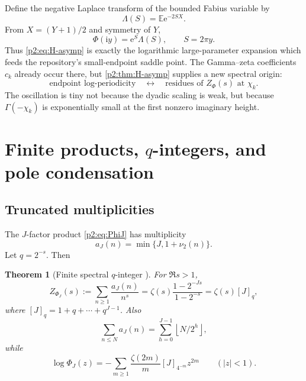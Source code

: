 \documentclass[11pt]{article}
\numberwithin{equation}{section}
\newtheorem{theorem}{Theorem}[section]
\theoremstyle{definition}
\theoremstyle{remark}
\newcommand{\E}{\mathbb E}
\newcommand{\e}{\mathrm e}
\newcommand{\ii}{\mathrm i}
\newcommand{\floor}[1]{\left\lfloor#1\right\rfloor}
\begin{document}
Define the negative Laplace transform of the bounded Fabius variable by
\begin{equation}
 \Lambda(S)=\E\e^{-2SX}.                                   \label{p2:eq:Lambda}
\end{equation}
From $X=(Y+1)/2$ and symmetry of $Y$,
\begin{equation}
 \boxed{\Phi(\ii y)=\e^S\Lambda(S),\qquad S=2\pi y.}       \label{p2:eq:duality}
\end{equation}
Thus \eqref{p2:eq:H-asymp} is exactly the logarithmic large-parameter expansion
which feeds the repository's small-endpoint saddle point.  The Gamma--zeta
coefficients $c_k$ already occur there, but \cref{p2:thm:H-asymp} supplies a new
spectral origin:
\begin{equation}
 \text{endpoint log-periodicity}
 \quad\longleftrightarrow\quad
 \text{residues of }Z_\Phi(s)\text{ at }\chi_k.             \label{p2:eq:duality-slogan}
\end{equation}
The oscillation is tiny not because the dyadic scaling is weak, but because
$\Gamma(-\chi_k)$ is exponentially small at the first nonzero imaginary height.

\section{Finite products, $q$-integers, and pole condensation}
\label{p2:sec:qfinite}

\subsection{Truncated multiplicities}

The $J$-factor product \eqref{p2:eq:PhiJ} has multiplicity
\begin{equation}
 a_J(n)=\min\{J,1+\nu_2(n)\}.                              \label{p2:eq:aJ}
\end{equation}
Let $q=2^{-s}$.  Then
\begin{theorem}[Finite spectral $q$-integer \NewResult]
\label{p2:thm:finite-zeta}
For $\Re s>1$,
\begin{equation}
 Z_{\Phi_J}(s):=\sum_{n\ge1}\frac{a_J(n)}{n^s}
 =\zeta(s)\frac{1-2^{-Js}}{1-2^{-s}}
 =\zeta(s)[J]_q,                                          \label{p2:eq:finite-zeta}
\end{equation}
where $[J]_q=1+q+\cdots+q^{J-1}$.  Also
\begin{equation}
 \sum_{n\le N}a_J(n)=\sum_{h=0}^{J-1}\floor{N/2^h},       \label{p2:eq:AJ}
\end{equation}
while
\begin{equation}
 \log\Phi_J(z)
 =-\sum_{m\ge1}\frac{\zeta(2m)}m[J]_{4^{-m}}z^{2m}
 \qquad(|z|<1).                                           \label{p2:eq:finite-taylor}
\end{equation}
\end{theorem}
\end{document}
